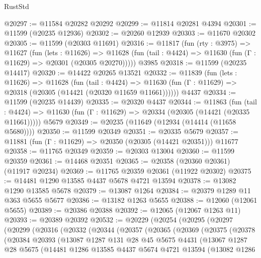 \begin{lexlean}{RustStd}
\begin{coremodule}
@20297 := @11584 @20282 @20292
@20299 := @11814 @20281 @4394
@20301 := @11599 (@20235 @12936)
@20302 := @20260 @12939
@20303 := @11670 @20302
@20305 := @11599 (@20303 @11691)
@20316 := @11817
    (fun (rty : @3975) =>
    @11627
      (fun (lets : @11626) =>
      @11628 (fun (tail : @4424) => @11630 (fun (Γ : @11629) => @20301 (@20305 @20270)))))
    @3985
@20318 := @11599 (@20235 @14417)
@20320 := @14422 @20265 @13521
@20332 := @11839
    (fun (lets : @11626) =>
    @11628
      (fun (tail : @4424) =>
      @11630 (fun (Γ : @11629) => @20318 (@20305 (@14421 (@20320 @11659 @11661))))))
    @4437
@20334 := @11599 (@20235 @14439)
@20335 := @20320 @4437
@20344 := @11863
    (fun (tail : @4424) => @11630 (fun (Γ : @11629) => @20334 (@20305 (@14421 (@20335 @11661)))))
    @5679
@20349 := @20235 (@11649 (@12934 (@14414 (@11658 @5680))))
@20350 := @11599 @20349
@20351 := @20335 @5679
@20357 := @11881 (fun (Γ : @11629) => @20350 (@20305 (@14421 @20351))) @11677
@20358 := @11765 @20349
@20359 := @20303 @13004
@20360 := @11599 @20359
@20361 := @14468 @20351
@20365 := @20358 (@20360 @20361) (@11917 @20234)
@20369 := @11765 @20359 @20361 (@11922 @20302)
@20375 := @14481 @1290 @13585 @4437 @5678 @4721 @13594
@20378 := @13082 @1290 @13585 @5678
@20379 := @13087 @1264
@20384 := @20379 @1289 @11 @363 @5655 @5677
@20386 := @13182 @1263 @5655
@20388 := @12060 (@12061 @5655)
@20389 := @20386 @20388
@20392 := @12065 (@12067 @1263 @11)
@20393 := @20389 @20392
@20532 := @20229
    (@20254
      (@20295
        (@20297
          (@20299
            (@20316
              (@20332
                (@20344
                  (@20357
                    (@20365
                      (@20369
                        (@20375
                          (@20378
                            (@20384
                              @20393
                              (@13087
                                @1287
                                @131
                                @28
                                @45
                                @5675
                                @4431
                                (@13067
                                  @1287
                                  @28
                                  @5675
                                  (@14481
                                    @1286
                                    @13585
                                    @4437
                                    @5674
                                    @4721
                                    @13594
                                    (@13082
                                      @1286

\end{coremodule}
\end{lexlean}
